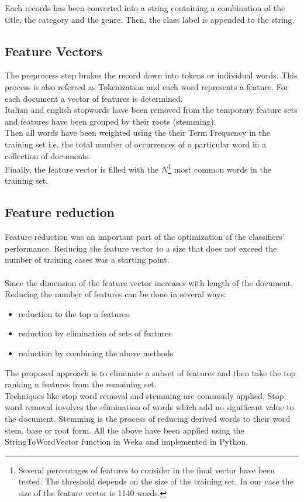 Each records has been converted into a string containing a combination of the title, the category and the genre. Then, the class label is appended to the string.

\subsection*{Feature Vectors}
The preprocess step brakes the record down into tokens or individual words. This process is also referred as Tokenization and each word represents a feature. For each document a vector of features is determined.\\
Italian and english stopwords have been removed from the temporary feature sets and features have been grouped by their roots (stemming).
\\
Then all words have been weighted using the their Term Frequency in the training set i.e. the total number of occurrences of a particular word in a collection of documents.\\ 
Finally, the feature vector is filled with the $N$\footnote{Several percentages of features to consider in the final vector have been tested. The threshold depends on the size of the training set. In our case the size of the feature vector is 1140 words.} most common words in the training set.

\subsection*{Feature reduction}
Feature reduction was an important part of the optimization of the classifiers' performance. Reducing the feature vector to a size that does not exceed the number of training cases was a starting point.\\
\\
Since the dimension of the feature vector increases with length of the document. Reducing the number of features can be done in several ways:
\begin{itemize}
	\item reduction to the top n features
	\item reduction by elimination of sets of features
	\item reduction by combining the above methods
\end{itemize} 
The proposed approach is to eliminate a subset of features and then take the top ranking n features from the remaining set.\\
Techniques like stop word removal and stemming are commonly applied. Stop word removal involves the elimination of words which add no significant value to the  document. Stemming is the process of reducing derived words to their word stem, base or root form.
All the above have been applied using the StringToWordVector function in Weka and implemented in Python.